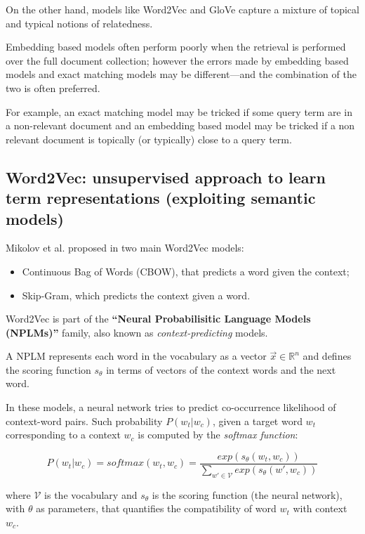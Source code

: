 On the other hand, models like Word2Vec \cite{w2v} and GloVe \cite{Glove} capture a mixture of topical and typical notions of relatedness.

Embedding based models often perform poorly when the retrieval is performed over the full document collection; however the errors made by embedding based models and exact matching models may be different—and the combination of the two is often preferred.

For example, an exact matching model may be tricked if some query term are in a non-relevant document and an embedding based model may be tricked if a non relevant document is topically (or typically) close to a query term.

\subsection{Word2Vec: unsupervised approach to learn term representations (exploiting semantic models)}

Mikolov et al. proposed in \cite{w2v} two main Word2Vec models: 

\begin{itemize}
 \item Continuous Bag of Words (CBOW), that predicts a word given the context;
 \item Skip-Gram, which predicts the context given a word.
\end{itemize}

Word2Vec is part of the \textbf{``Neural Probabilisitic Language Models (NPLMs)''} family, also known as \textit{context-predicting} models.

A NPLM represents each word in the vocabulary as a vector $\vec{x} \in \mathbb{R}^n$ and defines the scoring function $s_{\theta}$ in terms of vectors of the context words and the next word.

In these models, a neural network tries to predict co-occurrence likelihood of context-word pairs. Such probability $P(w_t | w_c)$, given a target word $w_t$ corresponding to a context $w_c$ is computed by the \textit{softmax function}:

\begin{equation}
P(w_t | w_c) = softmax(w_t, w_c) = \frac{exp(s_{\theta}(w_t,w_c))}{\sum_{w' \in \mathcal{V}} exp(s_{\theta}(w', w_c))}
\end{equation}

where $\mathcal{V}$ is the vocabulary and $s_{\theta}$ is the scoring function (the neural network), with $\theta$ as parameters, that quantifies the compatibility of word $w_t$ with context $w_c$.


